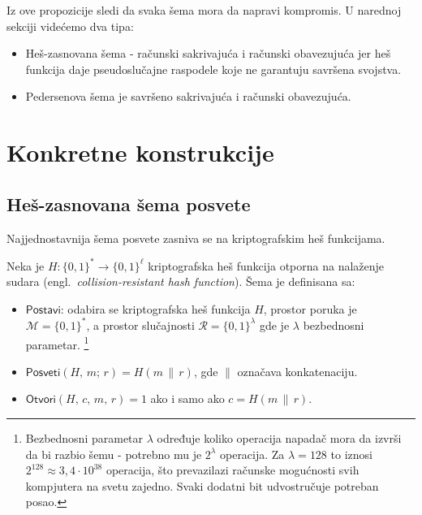 Iz ove propozicije sledi da svaka šema mora da napravi kompromis. U narednoj sekciji videćemo dva tipa:
\begin{itemize}
  \item Heš-zasnovana šema - računski sakrivajuća i računski obavezujuća jer heš funkcija daje pseudoslučajne
    raspodele koje ne garantuju savršena svojstva.
  \item Pedersenova šema je savršeno sakrivajuća i računski obavezujuća.
\end{itemize}

\section{Konkretne konstrukcije}
\label{sec:commitments-konstrukcije}

\subsection{Heš-zasnovana šema posvete}
\label{subsec:hash-commitment}

Najjednostavnija šema posvete zasniva se na kriptografskim heš funkcijama.

\begin{definition}
\label{def:hash-commitment}
Neka je $H \colon \{0,1\}^* \to \{0,1\}^\ell$ kriptografska heš funkcija otporna na
nalaženje sudara (engl.\ \textit{collision-resistant hash function}). Šema je definisana sa:
\begin{itemize}
  \item $\mathsf{Postavi}$: odabira se kriptografska heš funkcija $H$, prostor poruka je
    $\mathcal{M} = \{0,1\}^*$, a prostor slučajnosti $\mathcal{R} = \{0,1\}^\lambda$
    gde je $\lambda$ bezbednosni parametar.%
    \footnote{Bezbednosni parametar $\lambda$ određuje koliko operacija napadač mora da
    izvrši da bi razbio šemu - potrebno mu je $2^\lambda$ operacija.
    Za $\lambda = 128$ to iznosi $2^{128} \approx 3{,}4 \cdot 10^{38}$ operacija,
    što prevazilazi računske mogućnosti svih kompjutera na svetu zajedno.
    Svaki dodatni bit udvostručuje potreban posao.}
  \item $\mathsf{Posveti}(H,\, m;\, r) = H(m \,\|\, r)$, gde $\|$ označava konkatenaciju.
  \item $\mathsf{Otvori}(H,\, c,\, m,\, r) = 1$ ako i samo ako $c = H(m \,\|\, r)$.
\end{itemize}
\end{definition}

